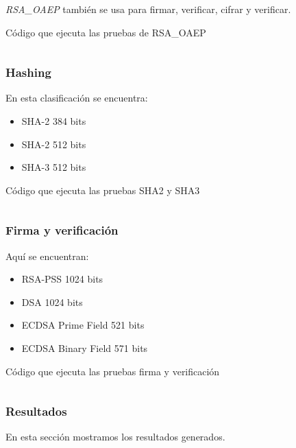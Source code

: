 \documentclass[../main.tex]{subfiles}
\begin{document}
\textit{RSA\_OAEP} también se usa para firmar, verificar, cifrar y verificar.
\begin{code}
  \caption{Código que ejecuta las pruebas de RSA\_OAEP}\label{sec:cifrado-y-descifrado-2}
  \inputminted[lastline=59]{python}{../src/test_algoritmos_crypto/RSAOAEPTest.py}
\end{code}

\subsubsection{Hashing}\label{hashing}
En esta clasificación se encuentra:
\begin{itemize}
  \item SHA-2 384 bits
  \item SHA-2 512 bits
  \item SHA-3 512 bits
\end{itemize}
\begin{code}
  \caption{Código que ejecuta las pruebas SHA2 y SHA3}\label{sec:hashing}
  \inputminted[lastline=49]{python}{../src/test_algoritmos_crypto/SHATests.py}
\end{code}

\subsubsection{Firma y verificación}\label{firma-y-verificacion}
Aquí se encuentran:
\begin{itemize}
  \item RSA-PSS 1024 bits
  \item DSA 1024 bits
  \item ECDSA Prime Field 521 bits
  \item ECDSA Binary Field 571 bits
\end{itemize}
\begin{code}
  \caption{Código que ejecuta las pruebas firma y verificación}\label{sec:firma-y-verificacion-1}
  \inputminted[lastline=49]{python}{../src/test_algoritmos_crypto/SignVerifTests.py}
\end{code}

\newpage{}

\subsubsection{Resultados}\label{sec:resultados}

En esta sección mostramos los resultados generados.
\end{document}
